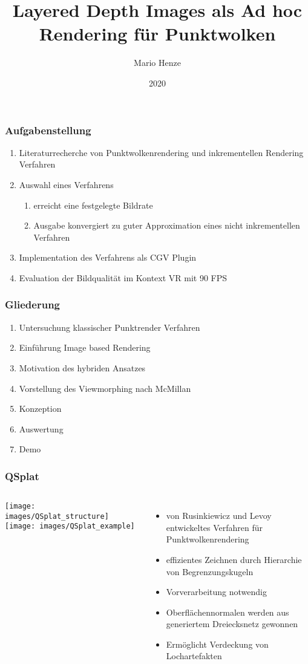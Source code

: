 \documentclass[aspectratio=169]{beamer}
\title{Layered Depth Images als Ad hoc Rendering für Punktwolken}
\author{Mario Henze}
\institute{Professur für Computergrafik und Visualisierung}
\date{2020}
\begin{document}
\frame{\titlepage}

\begin{frame}
    \frametitle{Aufgabenstellung}
    \begin{enumerate}
        \item Literaturrecherche von Punktwolkenrendering und inkrementellen Rendering Verfahren
        \item Auswahl eines Verfahrens
        \begin{enumerate}
            \item erreicht eine festgelegte Bildrate
            \item Ausgabe konvergiert zu guter Approximation eines nicht inkrementellen Verfahren
        \end{enumerate}
        \item Implementation des Verfahrens als CGV Plugin
        \item Evaluation der Bildqualität im Kontext VR mit 90 FPS
    \end{enumerate}
\end{frame}

\begin{frame}
    \frametitle{Gliederung}
    \begin{enumerate}
        \item Untersuchung klassischer Punktrender Verfahren
        \item Einführung Image based Rendering
        \item Motivation des hybriden Ansatzes
        \item Vorstellung des Viewmorphing nach McMillan
        \item Konzeption
        \item Auswertung
        \item Demo
    \end{enumerate}
\end{frame}

\begin{frame}
    \frametitle{QSplat}
    \begin{columns}
        \texttt{[image: images/QSplat\_structure]}
        \texttt{[image: images/QSplat\_example]}

        \begin{itemize}
            \item von Rusinkiewicz und Levoy entwickeltes Verfahren für Punktwolkenrendering
            \item effizientes Zeichnen durch Hierarchie von Begrenzungskugeln
            \item Vorverarbeitung notwendig
            \item Oberflächennormalen werden aus generiertem Dreiecksnetz gewonnen
            \item Ermöglicht Verdeckung von Lochartefakten
        \end{itemize}
    \end{columns}
\end{frame}
\end{document}
